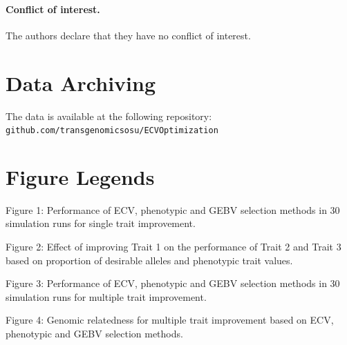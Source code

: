\documentclass[12pt, a4paper, bibliography=totoc]{scrartcl}
\begin{document}
\paragraph{Conflict of interest.}

The authors declare that they have no conflict of interest.
\section*{Data Archiving}\label{sec:data}

The data is available at the following repository: \texttt{github.com/transgenomicsosu/ECV\textunderscore Optimization}

\section*{Figure Legends}\label{sec:legends}

Figure 1: Performance of ECV, phenotypic and GEBV selection methods in 30 simulation runs for single trait improvement.

\noindent Figure 2: Effect of improving Trait 1 on the performance of Trait 2 and Trait 3 based on proportion of desirable alleles and phenotypic trait values.

\noindent Figure 3: Performance of ECV, phenotypic and GEBV selection methods in 30 simulation runs for multiple trait improvement.

\noindent Figure 4: Genomic relatedness for multiple trait improvement based on ECV, phenotypic and GEBV selection methods.

\begingroup
\raggedright

\endgroup
\end{document}

